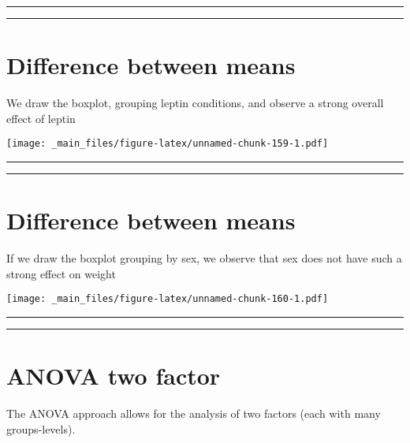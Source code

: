 \documentclass[
]{book}
\begin{document}
\begin{center}\rule{0.5\linewidth}{0.5pt}\end{center}

\begin{center}\rule{0.5\linewidth}{0.5pt}\end{center}

\hypertarget{difference-between-means-11}{%
\section{Difference between means}\label{difference-between-means-11}}

We draw the boxplot, grouping leptin conditions, and observe a strong overall effect of leptin

\texttt{[image: \_main\_files/figure-latex/unnamed-chunk-159-1.pdf]}

\begin{center}\rule{0.5\linewidth}{0.5pt}\end{center}

\begin{center}\rule{0.5\linewidth}{0.5pt}\end{center}

\hypertarget{difference-between-means-12}{%
\section{Difference between means}\label{difference-between-means-12}}

If we draw the boxplot grouping by sex, we observe that sex does not have such a strong effect on weight

\texttt{[image: \_main\_files/figure-latex/unnamed-chunk-160-1.pdf]}

\begin{center}\rule{0.5\linewidth}{0.5pt}\end{center}

\begin{center}\rule{0.5\linewidth}{0.5pt}\end{center}

\hypertarget{anova-two-factor-1}{%
\section{ANOVA two factor}\label{anova-two-factor-1}}

The ANOVA approach allows for the analysis of two factors (each with many groups-levels).
\end{document}
